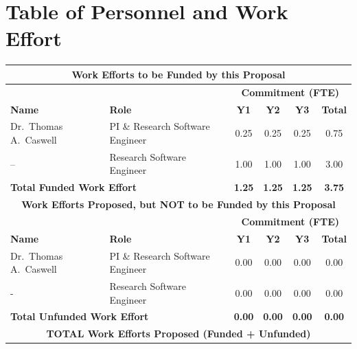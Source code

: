 \documentclass[12pt]{article}
\numberwithin{page}{section}
\begin{document}
\newpage

\section{Table of Personnel and Work Effort}
\setcounter{page}{1}

\begin{tabular}{|l|l|c|c|c|c|}
  \hline
  \multicolumn{6}{|c|}{\cellcolor{gray!30}\textbf{Work Efforts to be Funded by this Proposal}}\\
  \hline
  \cellcolor{gray!30} &  \cellcolor{gray!30}&\multicolumn{4}{c|}{\cellcolor{gray!30}\textbf{Commitment (FTE)}} \\
  \hhline{|*2{>{\arrayrulecolor{gray!30}}-}*4{>{\arrayrulecolor{black}}-}|}
  \cellcolor{gray!30}\textbf{Name }& \cellcolor{gray!30}\textbf{Role} & \cellcolor{gray!30}\textbf{Y1} & \cellcolor{gray!30}\textbf{Y2} & \cellcolor{gray!30}\textbf{Y3} & \cellcolor{gray!30}\textbf{Total}     \\  \hline
  Dr.\ Thomas A.\ Caswell & PI \& Research Software Engineer & 0.25 & 0.25 & 0.25 & 0.75 \\  \hline
  -- & Research Software Engineer & 1.00 & 1.00 & 1.00 & 3.00 \\  \hline
  \multicolumn{2}{|l|}{\textbf{Total Funded Work Effort}} & \textbf{1.25} & \textbf{1.25} & \textbf{1.25}& \textbf{3.75}\\    \hline
  \multicolumn{6}{|c|}{\cellcolor{gray!30}\textbf{Work Efforts Proposed, but NOT to be Funded by this Proposal}}\\  \hline
  \cellcolor{gray!30} &  \cellcolor{gray!30}&\multicolumn{4}{c|}{\cellcolor{gray!30}\textbf{Commitment (FTE)}} \\
  \hhline{|*2{>{\arrayrulecolor{gray!30}}-}*4{>{\arrayrulecolor{black}}-}|}
  \cellcolor{gray!30}\textbf{Name }& \cellcolor{gray!30}\textbf{Role} & \cellcolor{gray!30}\textbf{Y1} & \cellcolor{gray!30}\textbf{Y2} & \cellcolor{gray!30}\textbf{Y3} & \cellcolor{gray!30}\textbf{Total}     \\  \hline
  Dr.\ Thomas A.\ Caswell & PI \& Research Software Engineer & 0.00 & 0.00 & 0.00 & 0.00 \\  \hline
  - & Research Software Engineer & 0.00 & 0.00 & 0.00 & 0.00 \\  \hline
  \multicolumn{2}{|l|}{\textbf{Total Unfunded Work Effort}} & \textbf{0.00} & \textbf{0.00} & \textbf{0.00}& \textbf{0.00}\\\hline
  \multicolumn{6}{|c|}{\cellcolor{gray!30}\textbf{TOTAL Work Efforts Proposed (Funded + Unfunded)}}\\  \hline

\end{tabular}
\end{document}
